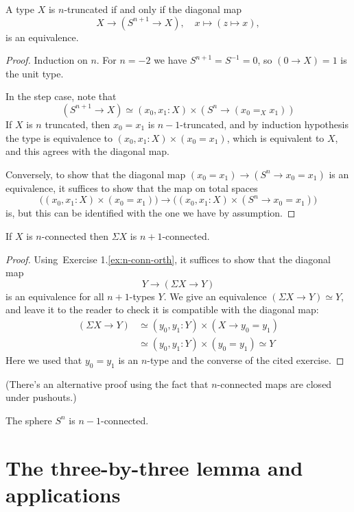 \documentclass[10pt,oneside,leqno,openright]{memoir}
\begin{document}
\begin{lemma}
  \label{lem:n-trunc-sphere-orth}
  A type $X$ is $n$-truncated if and only if the diagonal map
  \[ X \to (S^{n+1} \to X),\quad
    x\mapsto(z \mapsto x),\]
  is an equivalence.
\end{lemma}
\begin{proof}
  Induction on $n$. For $n=-2$ we have $S^{n+1}=S^{-1}=0$, so $(0\to X)=1$ is the unit type.

  In the step case, note that
  \[(S^{n+1} \to X) \simeq (x_0,x_1:X)\times(S^n \to (x_0=_Xx_1))\]
  If $X$ is $n$ truncated, then $x_0=x_1$ is $n-1$-truncated, and by induction hypothesis
  the type is equivalence to $(x_0,x_1:X)\times(x_0=x_1)$, which is equivalent to $X$,
  and this agrees with the diagonal map.

  Conversely, to show that the diagonal map $(x_0=x_1) \to (S^n \to x_0=x_1)$ is an equivalence,
  it suffices to show that the map on total spaces
  \[
    \bigl((x_0,x_1:X) \times (x_0=x_1)\bigr) \to
    \bigl((x_0,x_1:X) \times (S^n \to x_0=x_1)\bigr)
  \]
  is, but this can be identified with the one we have by assumption.
\end{proof}

\begin{theorem}
    If $X$ is $n$-connected then $\Sigma X$ is $n+1$-connected.
\end{theorem}
\begin{proof}
  Using~Exercise 1.\ref{ex:n-conn-orth}, it suffices to show that the diagonal map
  \[
    Y \to (\Sigma X \to Y)
  \]
  is an equivalence for all $n+1$-types $Y$. We give an equivalence $(\Sigma X \to Y) \simeq Y$,
  and leave it to the reader to check it is compatible with the diagonal map:
  \begin{align*}
    (\Sigma X \to Y) & \simeq (y_0,y_1 : Y) \times (X \to y_0=y_1) \\
                     & \simeq (y_0,y_1: Y) \times (y_0=y_1) \simeq Y
  \end{align*}
  Here we used that $y_0=y_1$ is an $n$-type and the converse of the cited exercise.
\end{proof}
(There's an alternative proof using the fact that $n$-connected maps are closed under pushouts.)

\begin{corollary}
    The sphere $S^n$ is $n-1$-connected.
\end{corollary}

\section{The three-by-three lemma and applications}
\end{document}
